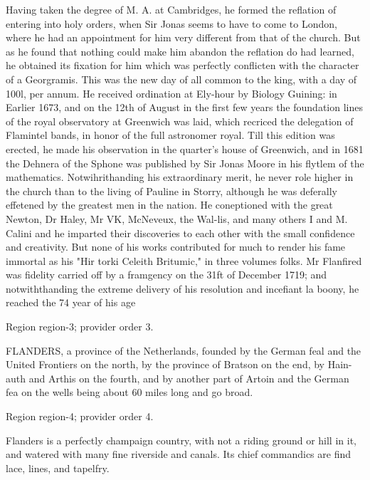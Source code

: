 \documentclass[11pt]{article}
\begin{document}
Having taken the degree of M. A. at Cambridges, he formed the reflation of entering into holy orders, when Sir Jonas seems to have to come to London, where he had an appointment for him very different from that of the church. But as he found that nothing could make him abandon the reflation do had learned, he obtained its fixation for him which was perfectly conflicten with the character of a Georgramis. This was the new day of all common to the king, with a day of 100l, per annum. He received ordination at Ely-hour by Biology Guining: in Earlier 1673, and on the 12th of August in the first few years the foundation lines of the royal observatory at Greenwich was laid, which recriced the delegation of Flamintel bands, in honor of the full astronomer royal. Till this edition was erected, he made his observation in the quarter's house of Greenwich, and in 1681 the Dehnera of the Sphone was published by Sir Jonas Moore in his flytlem of the mathematics. Notwihrithanding his extraordinary merit, he never role higher in the church than to the living of Pauline in Storry, although he was deferally effetened by the greatest men in the nation. He coneptioned with the great Newton, Dr Haley, Mr VK, McNeveux, the Wal-lis, and many others I and M. Calini and he imparted their discoveries to each other with the small confidence and creativity. But none of his works contributed for much to render his fame immortal as his "Hir torki Celeith Britumic," in three volumes folks. Mr Flanfired was fidelity carried off by a framgency on the 31ft of December 1719; and notwiththanding the extreme delivery of his resolution and incefiant la boony, he reached the 74 year of his age
\par

{\scriptsize\color{gray} Region region-3; provider order 3.\par}
\medskip

FLANDERS, a province of the Netherlands, founded by the German feal and the United Frontiers on the north, by the province of Bratson on the end, by Hain- auth and Arthis on the fourth, and by another part of Artoin and the German fea on the wells being about 60 miles long and go broad.
\par

{\scriptsize\color{gray} Region region-4; provider order 4.\par}
\medskip

Flanders is a perfectly champaign country, with not a riding ground or hill in it, and watered with many fine riverside and canals. Its chief commandics are find lace, lines, and tapelfry.
\par
\end{document}
